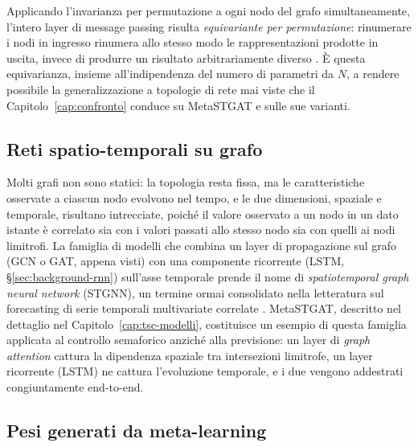 Applicando l'invarianza per permutazione a ogni nodo del grafo
simultaneamente, l'intero layer di message passing risulta
\emph{equivariante per permutazione}: rinumerare i nodi in ingresso
rinumera allo stesso modo le rappresentazioni prodotte in uscita, invece
di produrre un risultato arbitrariamente diverso
\citep{bronstein2021geometric}. È questa equivarianza, insieme
all'indipendenza del numero di parametri da $N$, a rendere possibile la
generalizzazione a topologie di rete mai viste che il
Capitolo~\ref{cap:confronto} conduce su MetaSTGAT e sulle sue varianti.

\subsection{Reti spatio-temporali su grafo}

Molti grafi non sono statici: la topologia resta fissa, ma le
caratteristiche osservate a ciascun nodo evolvono nel tempo, e le due
dimensioni, spaziale e temporale, risultano intrecciate, poiché il valore
osservato a un nodo in un dato istante è correlato sia con i valori
passati allo stesso nodo sia con quelli ai nodi limitrofi. La famiglia di modelli che combina un layer
di propagazione sul grafo (GCN o GAT, appena visti) con una componente
ricorrente (LSTM, §\ref{sec:background-rnn}) sull'asse temporale prende il
nome di \emph{spatiotemporal graph neural network} (STGNN), un termine
ormai consolidato nella letteratura sul forecasting di serie temporali
multivariate correlate \citep{cini2025graphdl}. MetaSTGAT, descritto nel
dettaglio nel Capitolo~\ref{cap:tsc-modelli}, costituisce un esempio di
questa famiglia applicata al controllo semaforico anziché alla previsione:
un layer di \emph{graph attention} cattura la dipendenza spaziale tra
intersezioni limitrofe, un layer ricorrente (LSTM) ne cattura l'evoluzione
temporale, e i due vengono addestrati congiuntamente end-to-end.

\subsection{Pesi generati da meta-learning}

